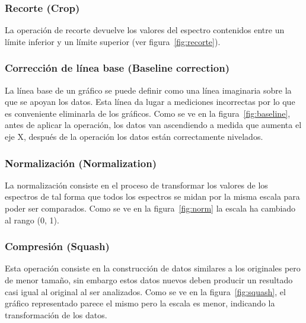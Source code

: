 \subsubsection{Recorte (Crop)}

La operación de recorte devuelve los valores del espectro contenidos entre un
límite inferior y un límite superior (ver figura~\ref{fig:recorte}).


\subsubsection{Corrección de línea base (Baseline correction)}

La línea base de un gráfico se puede definir como una línea imaginaria sobre la
que se apoyan los datos. Esta línea da lugar a mediciones incorrectas por lo que
es conveniente eliminarla de los gráficos. Como se ve en la
figura~\ref{fig:baseline}, antes de aplicar la operación, los datos van
ascendiendo a medida que aumenta el eje X, después de la operación los datos
están correctamente nivelados.


\subsubsection{Normalización (Normalization)}

La normalización consiste en el proceso de transformar los valores de los
espectros de tal forma que todos los espectros se midan por la misma escala para
poder ser comparados. Como se ve en la figura~\ref{fig:norm} la escala ha
cambiado al rango (0, 1).


\subsubsection{Compresión (Squash)}

Esta operación consiste en la construcción de datos similares a los originales
pero de menor tamaño, sin embargo estos datos nuevos deben producir un resultado
casi igual al original al ser analizados. Como se ve en la
figura~\ref{fig:squash}, el gráfico representado parece el mismo pero la escala
es menor, indicando la transformación de los datos.


